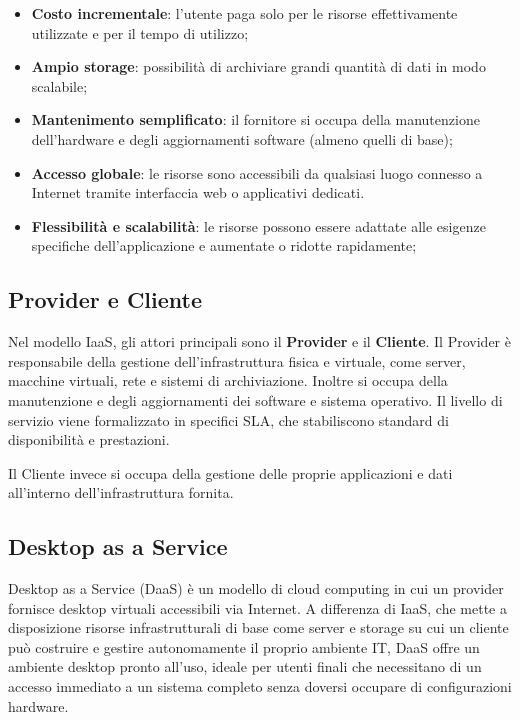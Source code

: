 \documentclass[12pt,a4paper,openright,twoside]{book}
\begin{document}
\begin{itemize}
    \item \textbf{Costo incrementale}: l'utente paga solo per le risorse effettivamente utilizzate e per il tempo di utilizzo;
    \item \textbf{Ampio storage}: possibilità di archiviare grandi quantità di dati in modo scalabile;
    \item \textbf{Mantenimento semplificato}: il fornitore si occupa della manutenzione dell'hardware e degli aggiornamenti software (almeno quelli di base);
    \item \textbf{Accesso globale}: le risorse sono accessibili da qualsiasi luogo connesso a Internet tramite interfaccia web o applicativi dedicati.
    \item \textbf{Flessibilità e scalabilità}: le risorse possono essere adattate alle esigenze specifiche dell'applicazione e aumentate o ridotte rapidamente;
\end{itemize}

\subsection{Provider e Cliente}
\label{subsec:provider_cliente}
Nel modello \ac{IaaS}, gli attori principali sono il \textbf{Provider} e il \textbf{Cliente}. Il Provider è responsabile della gestione dell'infrastruttura fisica e virtuale, come server, macchine virtuali, rete e sistemi di archiviazione. Inoltre si occupa della manutenzione e degli aggiornamenti dei software e sistema operativo\cite{bhardwaj2010cloud}.
Il livello di servizio viene formalizzato in specifici \ac{SLA}, che stabiliscono standard di disponibilità e prestazioni.

Il Cliente invece si occupa della gestione delle proprie applicazioni e dati all'interno dell'infrastruttura fornita\cite{bhardwaj2010cloud}.

\subsection{Desktop as a Service}
\label{subsec:daas}
Desktop as a Service (DaaS) è un modello di cloud computing in cui un provider fornisce desktop virtuali accessibili via Internet. A differenza di \ac{IaaS}, che mette a disposizione risorse infrastrutturali di base come server e storage su cui un cliente può costruire e gestire autonomamente il proprio ambiente IT, DaaS offre un ambiente desktop pronto all'uso, ideale per utenti finali che necessitano di un accesso immediato a un sistema completo senza doversi occupare di configurazioni hardware.
\end{document}
